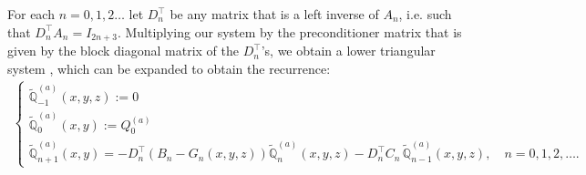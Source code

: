 \documentclass[11pt, oneside]{article}   	%
\newcommand{\Dnt}{D^\top_n}
\newcommand{\scop}{Q}
\newcommand{\scopa}{\scop^{(a)}}
\newcommand{\bigscopt}{\mathbb{\tilde{Q}}}
\newcommand{\bigscopta}{\bigscopt^{(a)}}
\begin{document}
For each $n = 0,1,2\dots$ let $\Dnt$ be any matrix that is a left inverse of $A_n$, i.e. such that $\Dnt A_n = I_{2n+3}$. Multiplying our system by the preconditioner matrix that is given by the block diagonal matrix of the $\Dnt$'s, we obtain a lower triangular system \cite[p78]{dunkl2014orthogonal}, which can be expanded to obtain the recurrence:
\begin{align*}
	\begin{cases}
		\bigscopta_{-1}(x,y,z) := 0 \\
		\bigscopta_{0}(x,y) := \scopa_0 \\
		\bigscopta_{n+1}(x,y) = -\Dnt (B_n-G_n(x,y,z)) \bigscopta_n(x,y,z) - \Dnt C_n  \, \bigscopta_{n-1}(x,y,z), \quad n = 0,1,2,\dots.
	\end{cases}
\end{align*}
\end{document}
